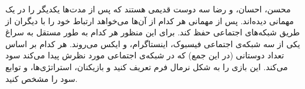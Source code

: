 محسن، احسان، و رضا سه دوست قدیمی هستند که پس از مدت‌ها یکدیگر را در یک مهمانی دیده‌اند. پس از مهمانی هر کدام از آن‌ها می‌خواهد ارتباط خود را با دیگران از طریق شبکه‌های اجتماعی حفظ کند. برای این منظور هر کدام به طور مستقل به سراغ یکی از سه شبکه‌ی اجتماعی فیسبوک، اینستاگرام، و ایکس می‌روند. هر کدام بر اساس تعداد دوستانی (در این جمع) که در شبکه‌ی اجتماعی مورد نظرش پیدا می‌کند سود می‌کند. این بازی را به شکل نرمال فرم تعریف کنید و بازیکنان، استراتژی‌ها، و توابع سود را مشخص کنید.